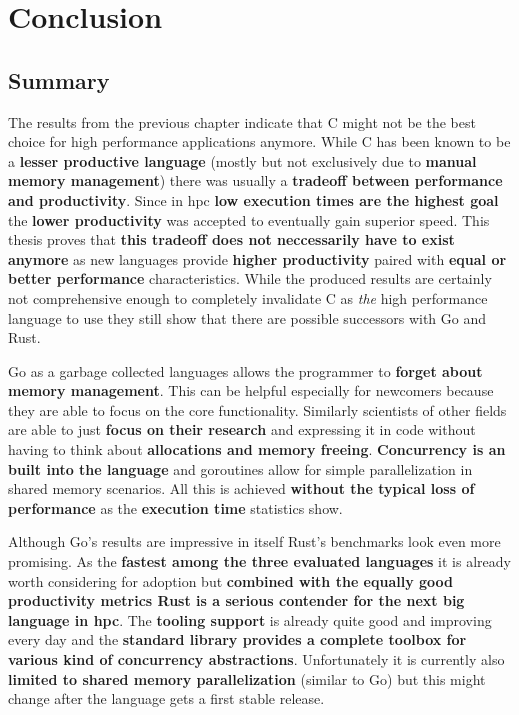 \chapter{Conclusion}
\label{ch:Conclusion}


\section{Summary}
\label{sec:Conclusion::Summary}

The results from the previous chapter indicate that C might not be the best choice for high performance applications anymore. While C has been known to be a \textbf{lesser productive language} (mostly but not exclusively due to \textbf{manual memory management}) there was usually a \textbf{tradeoff between performance and productivity}. Since in \gls{hpc} \textbf{low execution times are the highest goal} the \textbf{lower productivity} was accepted to eventually gain superior speed. This thesis proves that \textbf{this tradeoff does not neccessarily have to exist anymore} as new languages provide \textbf{higher productivity} paired with \textbf{equal or better performance} characteristics. While the produced results are certainly not comprehensive enough to completely invalidate C as \textit{the} high performance language to use they still show that there are possible successors with Go and Rust.

Go as a garbage collected languages allows the programmer to \textbf{forget about memory management}. This can be helpful especially for newcomers because they are able to focus on the core functionality. Similarly scientists of other fields are able to just \textbf{focus on their research} and expressing it in code without having to think about \textbf{allocations and memory freeing}. \textbf{Concurrency is an built into the language} and \glspl{goroutine} allow for simple parallelization in shared memory scenarios. All this is achieved \textbf{without the typical loss of performance} as the \textbf{execution time} statistics show.

Although Go's results are impressive in itself Rust's benchmarks look even more promising. As the \textbf{fastest among the three evaluated languages} it is already worth considering for adoption but \textbf{combined with the equally good productivity metrics Rust is a serious contender for the next big language in \acrlong{hpc}}. The \textbf{tooling support} is already quite good and improving every day and the \textbf{standard library provides a complete toolbox for various kind of concurrency abstractions}. Unfortunately it is currently also \textbf{limited to shared memory parallelization} (similar to Go) but this might change after the language gets a first stable release.

